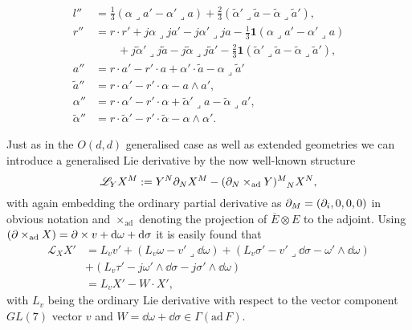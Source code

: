 \begin{equation}\label{eq:E7AdjointAction}
    \begin{aligned}
        l'' &= \frac{1}{3}(\alpha\lrcorner a'-\alpha'\lrcorner a)+\frac{2}{3}(\tilde{\alpha}'\lrcorner\tilde{a}-\tilde{\alpha}\lrcorner\tilde{a}'),\\
        r'' &= r\cdot r'+j\alpha\lrcorner ja'-j\alpha'\lrcorner ja-\frac{1}{3}\mathbf{1}(\alpha\lrcorner a'-\alpha'\lrcorner a)\\
        &\qquad+j\tilde{\alpha}'\lrcorner j\tilde{a}-j\tilde{\alpha}\lrcorner j\tilde{a}'-\frac{2}{3}\mathbf{1}(\tilde{\alpha}'\lrcorner \tilde{a}-\tilde{\alpha}\lrcorner \tilde{a}'),\\
        a'' &= r\cdot a'-r'\cdot a+\alpha'\cdot\tilde{a}-\alpha\lrcorner \tilde{a}'\\
        \tilde{a}'' &= r\cdot\alpha'-r'\cdot\alpha-a\wedge a',\\
        \alpha'' &= r\cdot\alpha'-r'\cdot\alpha+\tilde{\alpha}'\lrcorner a-\tilde{\alpha}\lrcorner a',\\
        \tilde{\alpha}'' &= r\cdot\tilde{\alpha}'-r'\cdot\tilde{\alpha}-\alpha\wedge\alpha'.
    \end{aligned}
\end{equation}

Just as in the $O(d,d)$ generalised case as well as extended geometries we can introduce a generalised Lie derivative by the now well-known structure
\begin{equation}
    \mathscr{L}_Y X^M := Y^N\pd_NX^M-(\pd_N\times_{\text{ad}}Y)\tensor{}{^M_N}X^N,
\end{equation}
with again embedding the ordinary partial derivative as $\partial_M=(\partial_i,0,0,0)$ in obvious notation and $\times_{\text{ad}}$ denoting the projection of $\overbar{E}\otimes E$ to the adjoint. Using $(\partial\times_{\text{ad}}X)=\partial\times v+\mathrm{d}\omega+\mathrm{d}\sigma$ it is easily found that 
\begin{equation}\label{eq:GengeometryLieDerivate}
    \begin{aligned}
        \mathscr{L}_X X' &= L_vv'+(L_v\omega-v'\lrcorner\dd\omega)+(L_v\sigma'-v'\lrcorner\dd\sigma-\omega'\wedge\dd\omega)\\
        &+(L_v\tau'-j\omega'\wedge\dd\sigma-j\sigma'\wedge\dd\omega)\\
        &= L_v X'-W\cdot X',
    \end{aligned}
\end{equation}
with $L_v$ being the ordinary Lie derivative with respect to the vector component $GL(7)$ vector $v$ and $W=\dd\omega+\dd\sigma \in\Gamma(\text{ad}\,F)$. 



